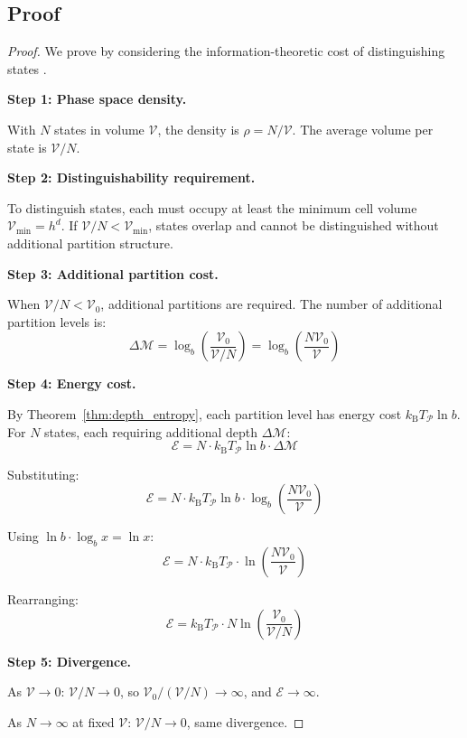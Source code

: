 \documentclass[twocolumn,10pt,a4paper]{article}
\theoremstyle{definition}
\theoremstyle{remark}
\newcommand{\kB}{k_{\mathrm{B}}}
\newcommand{\Partition}{\mathcal{P}}
\newcommand{\Depth}{\mathcal{M}}
\newcommand{\Cost}{\mathcal{E}}
\begin{document}
\subsection{Proof}

\begin{proof}
We prove by considering the information-theoretic cost of distinguishing states \cite{landauer1961}.

\textbf{Step 1: Phase space density.}

With $N$ states in volume $\mathcal{V}$, the density is $\rho = N/\mathcal{V}$. The average volume per state is $\mathcal{V}/N$.

\textbf{Step 2: Distinguishability requirement.}

To distinguish states, each must occupy at least the minimum cell volume $\mathcal{V}_{\min} = h^d$. If $\mathcal{V}/N < \mathcal{V}_{\min}$, states overlap and cannot be distinguished without additional partition structure.

\textbf{Step 3: Additional partition cost.}

When $\mathcal{V}/N < \mathcal{V}_0$, additional partitions are required. The number of additional partition levels is:
\begin{equation}
    \Delta\Depth = \log_b\left(\frac{\mathcal{V}_0}{\mathcal{V}/N}\right) = \log_b\left(\frac{N\mathcal{V}_0}{\mathcal{V}}\right)
\end{equation}

\textbf{Step 4: Energy cost.}

By Theorem~\ref{thm:depth_entropy}, each partition level has energy cost $\kB T_{\Partition} \ln b$. For $N$ states, each requiring additional depth $\Delta\Depth$:
\begin{equation}
    \Cost = N \cdot \kB T_{\Partition} \ln b \cdot \Delta\Depth
\end{equation}

Substituting:
\begin{equation}
    \Cost = N \cdot \kB T_{\Partition} \ln b \cdot \log_b\left(\frac{N\mathcal{V}_0}{\mathcal{V}}\right)
\end{equation}

Using $\ln b \cdot \log_b x = \ln x$:
\begin{equation}
    \Cost = N \cdot \kB T_{\Partition} \cdot \ln\left(\frac{N\mathcal{V}_0}{\mathcal{V}}\right)
\end{equation}

Rearranging:
\begin{equation}
    \Cost = \kB T_{\Partition} \cdot N \ln\left(\frac{\mathcal{V}_0}{\mathcal{V}/N}\right)
\end{equation}

\textbf{Step 5: Divergence.}

As $\mathcal{V} \to 0$: $\mathcal{V}/N \to 0$, so $\mathcal{V}_0/(\mathcal{V}/N) \to \infty$, and $\Cost \to \infty$.

As $N \to \infty$ at fixed $\mathcal{V}$: $\mathcal{V}/N \to 0$, same divergence.
\end{proof}
\end{document}

